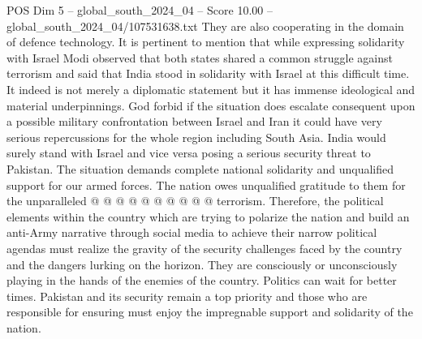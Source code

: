 \begin{textsample}{POS Dim 5 – global\_south\_2024\_04 – Score 10.00 – global\_south\_2024\_04/107531638.txt}
They are also cooperating in the domain of defence technology.
It is pertinent to mention that while expressing solidarity with Israel Modi observed that both states shared a common struggle against terrorism and said that India stood in solidarity with Israel at this difficult time.
It indeed is not merely a diplomatic statement but it has immense ideological and material underpinnings.
God forbid if the situation does escalate consequent upon a possible military confrontation between Israel and Iran it could have very serious repercussions for the whole region including South Asia.
India would surely stand with Israel and vice versa posing a serious security threat to Pakistan.
The situation demands complete national solidarity and unqualified support for our armed forces.
The nation owes unqualified gratitude to them for the unparalleled @ @ @ @ @ @ @ @ @ @ terrorism.
Therefore, the political elements within the country which are trying to polarize the nation and build an anti-Army narrative through social media to achieve their narrow political agendas must realize the gravity of the security challenges faced by the country and the dangers lurking on the horizon.
They are consciously or unconsciously playing in the hands of the enemies of the country.
Politics can wait for better times.
Pakistan and its security remain a top priority and those who are responsible for ensuring must enjoy the impregnable support and solidarity of the nation.

\end{textsample}
